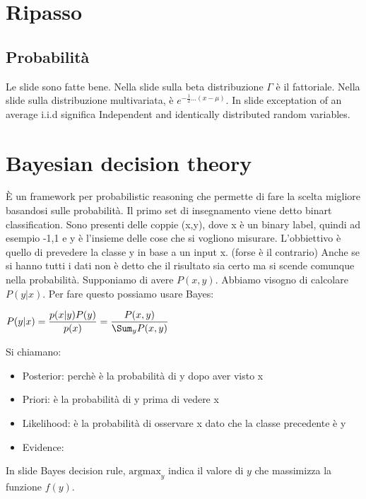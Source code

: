 \chapter{Ripasso}
\section{Probabilità}
Le slide sono fatte bene.\newline
Nella slide sulla beta distribuzione $\Gamma$ è il fattoriale.\newline
Nella slide sulla distribuzione multivariata, è $e^{-\frac{1}{2}...(x-\mu)}$.\newline
In slide exceptation of an average i.i.d significa Independent and identically distributed random variables. \newline
\chapter{Bayesian decision theory}
È un framework per probabilistic reasoning che permette di fare la scelta migliore basandosi sulle probabilità. \newline
Il primo set di insegnamento viene detto binart classification. Sono presenti delle coppie (x,y), dove x è un binary label, quindi ad esempio -1,1 e y è l'insieme delle cose che si vogliono misurare. L'obbiettivo è quello di prevedere la classe y in base a un input x. (forse è il contrario)\newline
Anche se si hanno tutti i dati non è detto che il risultato sia certo ma si scende comunque nella probabilità. Supponiamo di avere $P(x,y)$. Abbiamo visogno di calcolare $P(y\vert x)$. Per fare questo possiamo usare Bayes:
\begin{center}
	$\displaystyle P(y\vert x)=\frac{p(x\vert y)P(y)}{p(x)}=\frac{P(x,y)}{\Sum_yP(x,y)}$
\end{center}
Si chiamano:
\begin{itemize}
	\item Posterior: perchè è la probabilità di y dopo aver visto x
	\item Priori: è la probabilità di y prima di vedere x
	\item Likelihood: è la probabilità di osservare x dato che la classe precedente è y
	\item Evidence: 
\end{itemize}
In slide Bayes decision rule, $\text{argmax}_y$ indica il valore di $y$ che massimizza la funzione $f(y)$.

